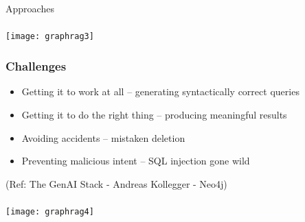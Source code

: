 \begin{frame}[fragile]\frametitle{}
\begin{center}
{\Large Approaches}
\end{center}
\end{frame}


\begin{frame}[fragile]\frametitle{}

	\begin{center}
	\texttt{[image: graphrag3]}
	\end{center}
	
	
\end{frame}

\begin{frame}[fragile]\frametitle{Challenges}
    \begin{itemize}
        \item Getting it to work at all – generating syntactically correct queries
        \item Getting it to do the right thing – producing meaningful results
        \item Avoiding accidents – mistaken deletion
        \item Preventing malicious intent – SQL injection gone wild
    \end{itemize}
	
	{\tiny (Ref: The GenAI Stack - Andreas Kollegger - Neo4j)}
	
\end{frame}


\begin{frame}[fragile]\frametitle{}

	\begin{center}
	\texttt{[image: graphrag4]}
	\end{center}
	
\end{frame}

